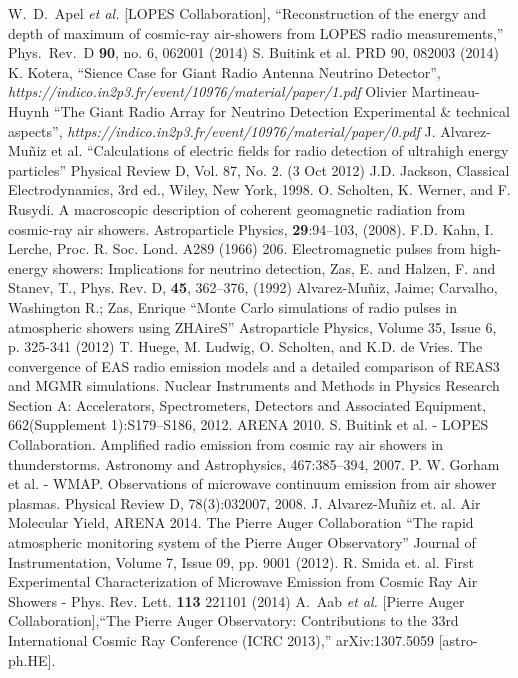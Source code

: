 \begin{thebibliography}{1}
 W.~D.~Apel {\it et al.} [LOPES Collaboration], ``Reconstruction of the energy and depth of maximum of cosmic-ray air-showers from LOPES radio measurements,'' Phys.\ Rev.\ D {\bf 90}, no. 6, 062001 (2014)
 S. Buitink et al. PRD 90, 082003 (2014)
 K. Kotera, ``Sience Case for Giant Radio Antenna Neutrino Detector'', \emph{https://indico.in2p3.fr/event/10976/material/paper/1.pdf}
 Olivier Martineau-Huynh ``The Giant Radio Array for Neutrino Detection Experimental $\&$ technical aspects'', \emph{https://indico.in2p3.fr/event/10976/material/paper/0.pdf}
 J. Alvarez-Mu\~niz et al. ``Calculations of electric fields for radio detection of ultrahigh energy particles'' Physical Review D, Vol. 87, No. 2. (3 Oct 2012)
 J.D. Jackson, Classical Electrodynamics, 3rd ed., Wiley, New York, 1998.
 O. Scholten, K. Werner, and F. Rusydi. A macroscopic description of coherent geomagnetic radiation from cosmic-ray air showers. Astroparticle Physics, {\bf 29}:94–103, (2008).
 F.D. Kahn, I. Lerche, Proc. R. Soc. Lond. A289 (1966) 206.
 Electromagnetic pulses from high-energy showers: Implications for neutrino detection, Zas, E. and Halzen, F. and Stanev, T., Phys. Rev. D, \textbf{45}, 362--376, (1992)
 Alvarez-Muñiz, Jaime; Carvalho, Washington R.; Zas, Enrique ``Monte Carlo simulations of radio pulses in atmospheric showers using ZHAireS'' Astroparticle Physics, Volume 35, Issue 6, p. 325-341 (2012)
 T. Huege, M. Ludwig, O. Scholten, and K.D. de Vries. The convergence of EAS radio emission models and a detailed comparison of REAS3 and MGMR simulations. Nuclear Instruments and Methods in Physics Research Section A: Accelerators, Spectrometers, Detectors and Associated Equipment, 662(Supplement 1):S179–S186, 2012. ARENA 2010.
 S. Buitink et al. - LOPES Collaboration. Amplified radio emission from cosmic ray air showers in thunderstorms. Astronomy and Astrophysics, 467:385–394, 2007.
 P. W. Gorham et al. - WMAP. Observations of microwave continuum emission from air shower plasmas. Physical Review D, 78(3):032007, 2008.
 J. Alvarez-Mu\~niz et. al. Air Molecular Yield, ARENA 2014.
 The Pierre Auger Collaboration ``The rapid atmospheric monitoring system of the Pierre Auger Observatory'' Journal of Instrumentation, Volume 7, Issue 09, pp. 9001 (2012).
 R. Smida et. al. First Experimental Characterization of Microwave Emission from Cosmic Ray Air Showers - Phys. Rev. Lett. \textbf{113} 221101 (2014)
 A.~Aab {\it et al.} [Pierre Auger Collaboration],``The Pierre Auger Observatory: Contributions to the 33rd International Cosmic Ray Conference (ICRC 2013),'' arXiv:1307.5059 [astro-ph.HE].


\end{thebibliography}

